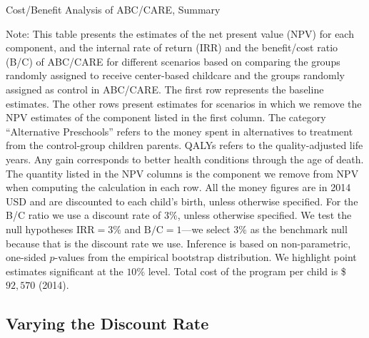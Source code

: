 \begin{table}[H]
\centering
\caption{Cost/Benefit Analysis of ABC/CARE, Summary}\label{table:cba}
\begin{threeparttable}
\tiny

\begin{tablenotes}
\footnotesize
\item Note: This table presents the estimates of the net present value (NPV) for each component, and the internal rate of return (IRR) and the benefit/cost ratio (B/C) of ABC/CARE for different scenarios based on comparing the groups randomly assigned to receive center-based childcare and the groups randomly assigned as control in ABC/CARE. The first row represents the baseline estimates. The other rows present estimates for scenarios in which we remove the NPV estimates of the component listed in the first column. The category ``Alternative Preschools'' refers to the money spent in alternatives to treatment from the control-group children parents. QALYs refers to the quality-adjusted life years. Any gain corresponds to better health conditions through the age of death. The quantity listed in the NPV columns is the component we remove from NPV when computing the calculation in each row. All the money figures are in 2014 USD and are discounted to each child's birth, unless otherwise specified. For the B/C ratio we use a discount rate of $3\%$, unless otherwise specified. We test the null hypotheses $\text{IRR} = 3\%$ and $\text{B/C} = 1$---we select $3\%$ as the benchmark null because that is the discount rate we use. Inference is based on non-parametric, one-sided $p$-values from the empirical bootstrap distribution. We highlight point estimates significant at the $10\%$ level. Total cost of the program per child is \$$92,570$ (2014).
\end{tablenotes}
\end{threeparttable}
\end{table}

\subsection{Varying the Discount Rate}
\label{appendix:varying-discount-rate}


